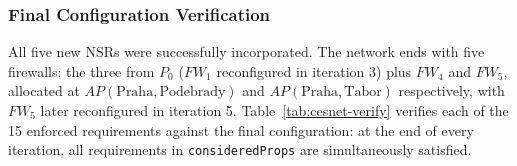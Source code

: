 \subsubsection{Final Configuration Verification}

All five new NSRs were successfully incorporated. The network ends with five firewalls: the three from $P_0$ ($\mathit{FW}_1$ reconfigured in iteration 3) plus $\mathit{FW}_4$ and $\mathit{FW}_5$, allocated at $\mathit{AP}(\text{Praha},\text{Podebrady})$ and $\mathit{AP}(\text{Praha},\text{Tabor})$ respectively, with $\mathit{FW}_5$ later reconfigured in iteration 5. Table~\ref{tab:cesnet-verify} verifies each of the 15 enforced requirements against the final configuration: at the end of every iteration, all requirements in \texttt{consideredProps} are simultaneously satisfied.

